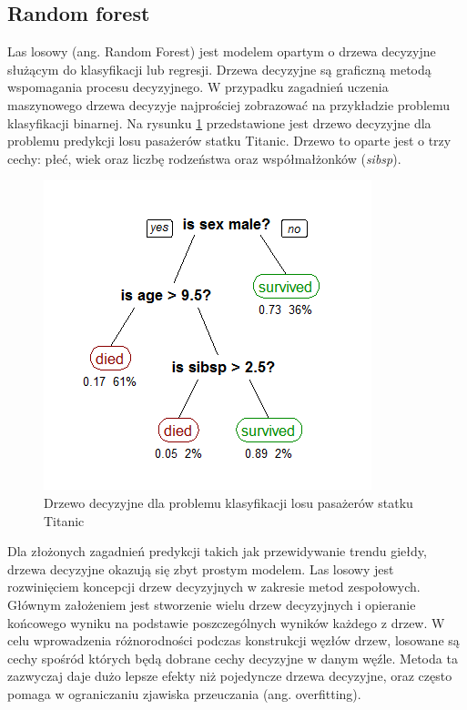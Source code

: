 \documentclass[a4paper, twoside, 11pt, openright]{article}
\begin{document}
\subsection{Random forest}

Las losowy (ang. Random Forest)\cite{randforest} jest modelem opartym o drzewa decyzyjne służącym do klasyfikacji lub regresji. Drzewa decyzyjne są graficzną metodą wspomagania procesu decyzyjnego. W przypadku zagadnień uczenia maszynowego drzewa decyzyje najprościej zobrazować na przykładzie problemu klasyfikacji binarnej. Na rysunku \ref{img:wiki_dec_tree} przedstawione jest drzewo decyzyjne dla problemu predykcji losu pasażerów statku Titanic. Drzewo to oparte jest o trzy cechy: płeć, wiek oraz liczbę rodzeństwa oraz współmałżonków (\textit{sibsp}). 

\begin{figure}[H]
\centering \includegraphics[scale=0.6]{img/decision_tree.png}
\caption{Drzewo decyzyjne dla problemu klasyfikacji losu pasażerów statku Titanic \cite{wikidecisiontree}}
\label{img:wiki_dec_tree}
\end{figure}

Dla złożonych zagadnień predykcji takich jak przewidywanie trendu giełdy, drzewa decyzyjne okazują się zbyt prostym modelem. Las losowy jest rozwinięciem koncepcji drzew decyzyjnych w zakresie metod zespołowych. Głównym założeniem jest stworzenie wielu drzew decyzyjnych i opieranie końcowego wyniku na podstawie poszczególnych wyników każdego z drzew. W celu wprowadzenia różnorodności podczas konstrukcji węzłów drzew, losowane są cechy spośród których będą dobrane cechy decyzyjne w danym węźle. Metoda ta zazwyczaj daje dużo lepsze efekty niż pojedyncze drzewa decyzyjne, oraz często pomaga w ograniczaniu zjawiska przeuczania (ang. overfitting).  
\end{document}

